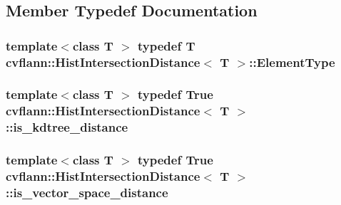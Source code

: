 \subsection{Member Typedef Documentation}
\hypertarget{structcvflann_1_1HistIntersectionDistance_aa4ca3b614996eaa55a9208854e8f3c07}{
\subsubsection[{Element\-Type}]{\setlength{\rightskip}{0pt plus 5cm}template$<$class T $>$ typedef {\bf T} {\bf cvflann\-::\-Hist\-Intersection\-Distance}$<$ {\bf T} $>$\-::{\bf Element\-Type}}}\label{structcvflann_1_1HistIntersectionDistance_aa4ca3b614996eaa55a9208854e8f3c07}
\hypertarget{structcvflann_1_1HistIntersectionDistance_a46f34e34cc458f0564d4deb8b91990c3}{
\subsubsection[{is\-\_\-kdtree\-\_\-distance}]{\setlength{\rightskip}{0pt plus 5cm}template$<$class T $>$ typedef {\bf True} {\bf cvflann\-::\-Hist\-Intersection\-Distance}$<$ {\bf T} $>$\-::{\bf is\-\_\-kdtree\-\_\-distance}}}\label{structcvflann_1_1HistIntersectionDistance_a46f34e34cc458f0564d4deb8b91990c3}
\hypertarget{structcvflann_1_1HistIntersectionDistance_af92ded76070af8fd088b758012ad0289}{
\subsubsection[{is\-\_\-vector\-\_\-space\-\_\-distance}]{\setlength{\rightskip}{0pt plus 5cm}template$<$class T $>$ typedef {\bf True} {\bf cvflann\-::\-Hist\-Intersection\-Distance}$<$ {\bf T} $>$\-::{\bf is\-\_\-vector\-\_\-space\-\_\-distance}}}\label{structcvflann_1_1HistIntersectionDistance_af92ded76070af8fd088b758012ad0289}

